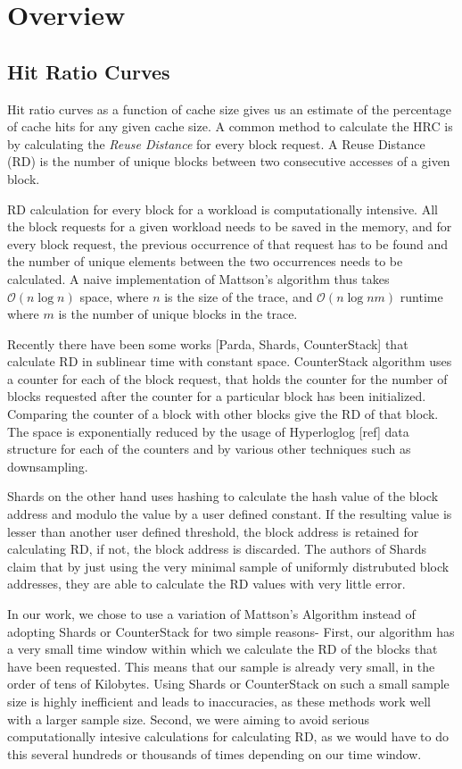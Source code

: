 \section{Overview}

\subsection{Hit Ratio Curves}

Hit ratio curves as a function of cache size gives us an estimate of the percentage of cache hits for any given cache size. A common method to calculate the HRC is by calculating the \emph{Reuse Distance} for every block request. A Reuse Distance (RD) is the number of unique blocks between two consecutive accesses of a given block.

RD calculation for every block for a workload is computationally intensive. All the block requests for a given workload needs to be saved in the memory, and for every block request, the previous occurrence of that request has to be found and the number of unique elements between the two occurrences needs to be calculated. A naive implementation of Mattson's algorithm thus takes $\mathcal{O}(n\log{}n)$ space, where $n$ is the size of the trace, and $\mathcal{O}(n\log{}nm)$ runtime where $m$ is the number of unique blocks in the trace.

Recently there have been some works [Parda, Shards, CounterStack] that calculate RD in sublinear time with constant space. CounterStack algorithm uses a counter for each of the block request, that holds the counter for the number of blocks requested after the counter for a particular block has been initialized. Comparing the counter of a block with other blocks give the RD of that block. The space is exponentially reduced by the usage of Hyperloglog [ref] data structure for each of the counters and by various other techniques such as downsampling.

Shards on the other hand uses hashing to calculate the hash value of the block address and modulo the value by a user defined constant. If the resulting value is lesser than another user defined threshold, the block address is retained for calculating RD, if not, the block address is discarded. The authors of Shards claim that by just using the very minimal sample of uniformly distrubuted block addresses, they are able to calculate the RD values with very little error.

In our work, we chose to use a variation of Mattson's Algorithm instead of adopting Shards or CounterStack for two simple reasons- First, our algorithm has a very small time window within which we calculate the RD of the blocks that have been requested. This means that our sample is already very small, in the order of tens of Kilobytes. Using Shards or CounterStack on such a small sample size is highly inefficient and leads to inaccuracies, as these methods work well with a larger sample size. Second, we were aiming to avoid serious computationally intesive calculations for calculating RD, as we would have to do this several hundreds or thousands of times depending on our time window.

